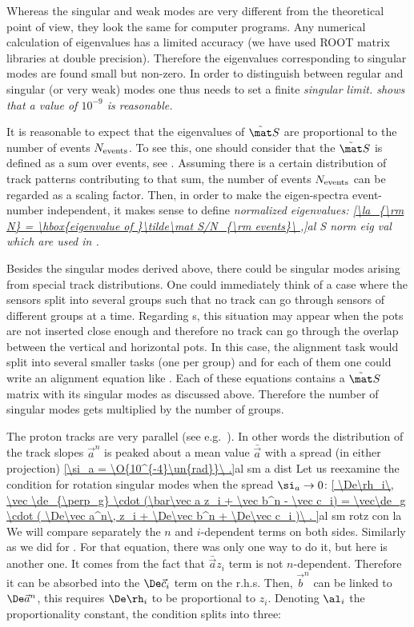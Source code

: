 Whereas the singular and weak modes are very different from the theoretical point of view, they look the same for computer programs. Any numerical calculation of eigenvalues has a limited accuracy (we have used ROOT matrix libraries  at double precision). Therefore the eigenvalues corresponding to singular modes are found small but non-zero. In order to distinguish between regular and singular (or very weak) modes one thus needs to set a finite \em{singular limit}.  shows that a value of $10^{-9}$ is reasonable.

It is reasonable to expect that the eigenvalues of $\tilde\mat S$ are proportional to the number of events $N_{\rm events}$. To see this, one should consider that the $\tilde\mat S$ is defined as a sum over events, see . Assuming there is a certain distribution of track patterns contributing to that sum, the number of events $N_{\rm events}$ can be regarded as a scaling factor. Then, in order to make the eigen-spectra event-number independent, it makes sense to define \em{normalized eigenvalues}:
\eqref{\la_{\rm N} = \hbox{eigenvalue of }\tilde\mat S/N_{\rm events}\ ,}{al S norm eig val}
which are used in .




Besides the singular modes derived above, there could be singular modes arising from special track distributions. One could immediately think of a case where the sensors split into several groups such that no track can go through sensors of different groups at a time. Regarding s, this situation may appear when the pots are not inserted close enough and therefore no track can go through the overlap between the vertical and horizontal pots. In this case, the alignment task would split into several smaller tasks (one per group) and for each of them one could write an alignment equation like . Each of these equations contains a $\tilde\mat S$ matrix with its singular modes as discussed above. Therefore the number of singular modes gets multiplied by the number of groups.

The  proton tracks are very parallel (see e.g.~). In other words the distribution of the track slopes $\vec a^n$ is peaked about a mean value $\bar\vec a$ with a spread (in either projection)
\eqref{\si_a = \O{10^{-4}\un{rad}}\ .}{al sm a dist}
Let us reexamine the condition for rotation singular modes  when the spread $\si_a\to 0$:
\eqref{
	\De\rh_i\, \vec \de_{\perp_g} \cdot (\bar\vec a z_i + \vec b^n - \vec c_i) =
	\vec\de_g \cdot (
		\De\vec a^n\, z_i +
		\De\vec b^n +
		\De\vec c_i
	)\ .
}{al sm rotz con la}
We will compare separately the $n$ and $i$-dependent terms on both sides. Similarly as we did for . For that equation, there was only one way to do it, but here is another one. It comes from the fact that $\bar\vec a z_i$ term is not $n$-dependent. Therefore it can be absorbed into the $\De\vec c_i$ term on the r.h.s. Then, $\vec b^n$ can be linked to $\De\vec a^n$, this requires $\De\rh_i$ to be proportional to $z_i$. Denoting $\al_i$ the proportionality constant, the condition splits into three:


